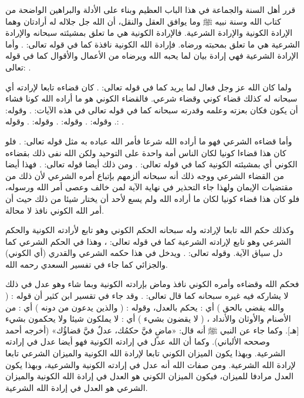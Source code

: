 قرر أهل السنة والجماعة في هذا الباب العظيم وبناء على الأدلة والبراهين الواضحة من كتاب الله وسنة نبيه ﷺ وما يوافق العقل والنقل، أن الله جل جلاله له أرادتان وهما الإرادة الكونية والإرادة الشرعية. فالإرادة الكونية هي ما تعلق بمشيئته سبحانه والإرادة الشرعية هي ما تعلق بمحبته ورضاه. فإرادة الله الكونية نافذة كما في قوله تعالى:
\quranayah*[36][82]{\footnotesize \surahname*[36]}. وأما الإرادة الشرعية فهي إرادة بيان لما يحبه الله ويرضاه من الأعمال والأقوال كما في قوله تعالى:
\quranayah*[4][26-28]{\footnotesize \surahname*[4]}.

ولما كان الله عز وجل فعال لما يريد كما في قوله تعالى:
\quranayah*[85][16]{\footnotesize \surahname*[16]}. كان قضاءه تابعا لإرادته أي سبحانه له كذلك قضاء كوني وقضاء شرعي. فالقضاء الكوني هو ما أراده الله كونا فشاء أن يكون فكان بعزته وعلمه وقدرته سبحانه كما في قوله تعالى في هذه الآيات:
\quranayah*[2][117]{\footnotesize \surahname*[2]}. وقوله:
\quranayah*[3][47]{\footnotesize \surahname*[3]}. وقوله:
\quranayah*[19][35]{\footnotesize \surahname*[19]}. وقوله:
\quranayah*[39][42]{\footnotesize \surahname*[39]}. وقوله:
\quranayah*[40][68]{\footnotesize \surahname*[40]}. وقوله:
\quranayah*[41][12]{\footnotesize \surahname*[41]}.

وأما قضاءه الشرعي فهو ما أراده الله شرعا فأمر الله عباده به مثل قوله تعالى:
\quranayah*[17][23]{\footnotesize \surahname*[17]}. فلو كان هذا قضاءا كونيا لكان الناس أمة واحدة على التوحيد ولكن الله نفى ذلك بقضاءه الكوني أي بمشيئته الكونية كما في قوله تعالى: \quranayah*[16][93]{\footnotesize \surahname*[16]}.
ومن ذلك أيضا قوله تعالى:
\quranayah*[33][36]{\footnotesize \surahname*[33]}. فهذا أيضا من القضاء الشرعي ووجه ذلك أنه سبحانه ألزمهم بإتباع أمره الشرعي لأن ذلك من مقتضيات الإيمان ولهذا جاء التحذير في نهاية الآية لمن خالف وعصى أمر الله ورسوله، فلو كان هذا قضاء كونيا لكان ما أراده الله ولم يسع لأحد أن يختار شيئا من ذلك حيث أن أمر الله الكوني نافذ لا محالة.

وكذلك حكم الله تابعا لإرادته وله سبحانه الحكم الكوني وهو تابع لأرادته الكونية والحكم الشرعي وهو تابع لإرادته الشرعية كما في قوله تعالى:
\quranayah*[5][1]{\footnotesize \surahname*[5]}، وهذا في الحكم الشرعي كما دل سياق الآية. وقوله تعالى:
\quranayah*[13][41]{\footnotesize \surahname*[13]}. ويدخل في هذا حكمه الشرعي والقدري (أي الكوني) والجزائي كما جاء في تفسير السعدي رحمه الله.


فحكم الله وقضاءه وأمره الكوني نافذ وماض بإرادته الكونية وبما شاء وهو عدل في ذلك لا يشاركه فيه غيره سبحانه كما قال تعالى:
\quranayah*[40][20]{\footnotesize \surahname*[40]}. وقد جاء في تقسير ابن كثير أن قوله : ( والله يقضي بالحق ) أي : يحكم بالعدل، وقوله : ( والذين يدعون من دونه ) أي : من الأصنام والأوثان والأنداد ، ( لا يقضون بشيء ) أي : لا يملكون شيئا ولا يحكمون بشيء [هـ]. وكما جاء عن النبي ﷺ أنه قال:
«ماضٍ فيَّ حكمُك، عدلٌ فيَّ قضاؤُك» {\footnotesize (أخرجه أحمد وصححه الألباني)}. وكما أن الله عدل في إرادته الكونية فهو أيضا عدل في إرادته الشرعية.
وبهذا يكون الميزان الكوني تابعا لإرادة الله الكونية والميزان الشرعي تابعا لإرادة الله الشرعية. ومن صفات الله أنه عدل في إرادته الكونية والشرعية، وبهذا يكون العدل مرادفا للميزان، فيكون الميزان الكوني هو العدل في إرادة الله الكونية والميزان الشرعي هو العدل في إرادة الله الشرعية.


